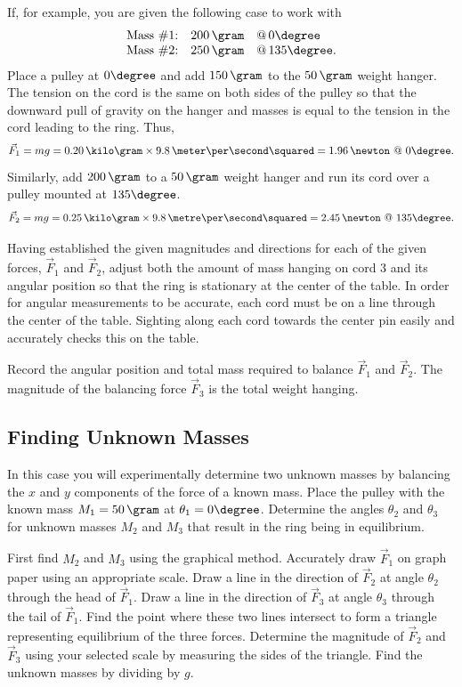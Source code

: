 If, for example, you are given the following case to work with
\[
\begin{array}{rll}
  \mbox{Mass \#1:} & 200\,\gram & \mbox{@}\,0\degree \\
  \mbox{Mass \#2:} & 250\,\gram & \mbox{@}\,135\degree.
\end{array}
\]
Place a pulley at $0\degree$ and add $150\,\gram$ to the $50\,\gram$ weight hanger.  The tension on the cord is the same on both sides of the pulley so that the downward pull of gravity on the hanger and masses is equal to the tension in the cord leading to the ring.  Thus,
\[
\vec{F}_1 = m g = 0.20\,\kilo\gram\times 9.8\,\meter\per\second\squared
         = 1.96\,\newton\ @\ 0\degree.
\]
Similarly, add $200\,\gram$ to a $50\,\gram$ weight hanger and run its cord over a pulley mounted at $135\degree$.
\[
\vec{F}_2 = m g = 0.25\,\kilo\gram\times 9.8\,\metre\per\second\squared
         = 2.45\,\newton\ @ \ 135\degree.
\]

Having established the given magnitudes and directions for each of the given forces, $\vec{F}_{1}$ and $\vec{F}_{2}$, adjust both the amount of mass hanging on cord 3 and its angular position so that the ring is stationary at the center of the table.  In order for angular measurements to be accurate, each cord must be on a line through the center of the table.  Sighting along each cord towards the center pin easily and accurately checks this on the table.

Record the angular position and total mass required to balance $\vec{F}_{1}$ and $\vec{F}_{2}$.  The magnitude of the balancing force $\vec{F}_{3}$ is the total weight hanging.

\subsection{Finding Unknown Masses}

In this case you will experimentally determine two unknown masses by balancing the $x$ and $y$ components of the force of a known mass.
Place the pulley with the known mass $M_1 = 50\,\gram $ at $\theta_1 = 0\degree$.
Determine the angles $\theta_2$ and $\theta_3$ for unknown masses $M_2$ and $M_3$ that result in the ring being in equilibrium.

First find $M_2$ and $M_3$ using the graphical method.
Accurately draw $ \vec{F}_1$ on graph paper using an appropriate scale.
Draw a line in the direction of $\vec{F}_2$ at angle $\theta_2$ through the head of $\vec{F}_1$.
Draw a line in the direction of $\vec{F}_3$ at angle $\theta_3$ through the tail of $\vec{F}_1$.
Find the point where these two lines intersect to form a triangle representing equilibrium of the three forces.
Determine the magnitude of $\vec{F}_2$ and $\vec{F}_3$ using your selected scale by measuring the sides of the triangle.
Find the unknown masses by dividing by $g$.

